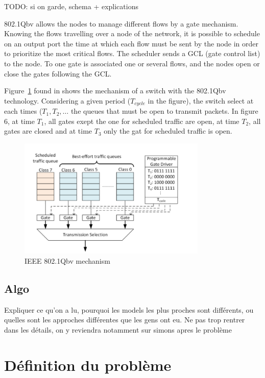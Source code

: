 \documentclass[a4paper,10pt]{article}
\newcommand{\todo}[1]{{\color{red} TODO: {#1}}}
\begin{document}
\todo{si on garde, schema + explications} 

802.1Qbv allows the nodes to manage different flows by a gate mechanism. Knowing the flows travelling over a node of the network, it is possible to schedule on an output port the time at which each flow must be sent by the node in order to prioritize the most critical flows. The scheduler sends a  GCL (gate control list) to the node. To one gate is associated one or several flows, and the nodes open or close the gates following the GCL.

Figure~\ref{fig:tsnqbv} found in \cite{durr2016no} shows the mechanism of a switch with the 802.1Qbv technology. Considering a given period ($T_{cycle}$ in the figure), the switch select at each times ($T_1 , T_2 , \ldots$ the queues that must be open to transmit packets. In figure 6, at time $T_1$, all gates exept the one for scheduled traffic are open, at time $T_2$, all gates are closed and at time $T_3$ only the gat for scheduled traffic is open.
  \begin{figure}[h]
      \begin{center}
      \includegraphics[width=0.8\textwidth]{tsnqbv.png}
      \end{center}
      \caption{IEEE 802.1Qbv mechanism}\label{fig:tsnqbv}
      \end{figure}

  
\subsection{Algo}
Expliquer ce qu'on a lu, pourquoi les models les plus proches sont différents, ou quelles sont les approches différentes que les gens ont eu. Ne pas trop rentrer dans les détails, on y reviendra notamment sur simons apres le problème

\section{Définition du problème}
\end{document}
